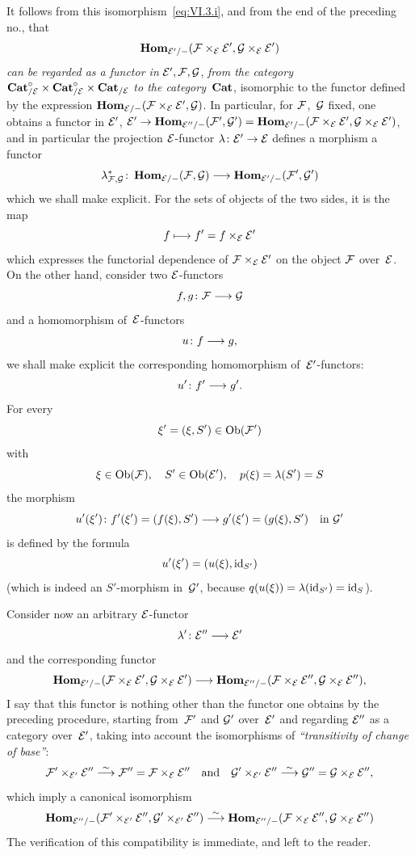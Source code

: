 It follows from this isomorphism~\eqref{eq:VI.3.i}, and from the end of
the preceding no., that
$$
\SheafHom_{\cal{E}'/-}(\cal{F}\times_{\cal{E}}\cal{E}',\cal{G}
\times_{\cal{E}}\cal{E}')
$$
\emph{can be regarded as a functor in}
$\cal{E}',\cal{F},\cal{G}$, \emph{from the category}
$\Cat_{/\cal{E}}^\circ\times\Cat_{/\cal{E}}^\circ\allowbreak\times\Cat_{/\cal{E}}$
\emph{to the category}~$\Cat$, isomorphic to the functor defined
by the expression
$\SheafHom_{\cal{E}/-}(\cal{F}\times_{\cal{E}}\cal{E}',\cal{G})$. In
particular, for $\cal{F}$,~$\cal{G}$ fixed, one obtains a
functor in $\cal{E}'$, $\cal{E}'\to
\SheafHom_{\cal{E}''/-}(\cal{F}',\cal{G}')=
\SheafHom_{\cal{E}'/-}(\cal{F}\times_{\cal{E}}
\cal{E}',\cal{G}\times_{\cal{E}}\cal{E}')$, and in particular the
projection $\cal{E}$-functor $\lambda\colon \cal{E}'\to\cal{E}$
defines a morphism \ie a functor
$$
\lambda^*_{\cal{F},\cal{G}}\colon
\SheafHom_{\cal{E}/-}(\cal{F},\cal{G})\to
\SheafHom_{\cal{E}'/-}(\cal{F}',\cal{G}')
$$
which we shall make explicit. For the sets of objects of the two
sides, it is the map
$$
f\mto f'=f\times_{\cal{E}}\cal{E}'
$$
which expresses the functorial dependence of
$\cal{F}\times_{\cal{E}}\cal{E}'$ on the object $\cal{F}$
over~$\cal{E}$. On the other hand, consider two $\cal{E}$-functors
$$
f,g\colon\cal{F}\to \cal{G}
$$
and a homomorphism of~$\cal{E}$-functors
$$
u\colon f\to g\quoi,
$$
we
shall make explicit the corresponding homomorphism of~$\cal{E}'$-functors:
$$
u'\colon f'\to g'\quoi.
$$
For every
$$
\xi'=(\xi,S')\in\Ob(\cal{F}')
$$
with
$$
\xi\in\Ob(\cal{F}),\quad S'\in\Ob(\cal{E}'),\quad p(\xi)=\lambda(S')=S
$$
the morphism
$$
u'(\xi')\colon f'(\xi')=(f(\xi),S')\to g'(\xi')=(g(\xi),S')\quad
\text{in } \cal{G}'
$$
is defined by the formula
$$
u'(\xi')=(u(\xi),\id_{S'})
$$
(which is indeed an $S'$-morphism in~$\cal{G}'$, because
$q(u(\xi))=\lambda(\id_{S'})=\id_S$).

Consider now an arbitrary $\cal{E}$-functor
$$
\lambda'\colon\cal{E}''\to\cal{E}'
$$
and the corresponding functor
$$
\SheafHom_{\cal{E}'/-}(\cal{F}\times_{\cal{E}}\cal{E}',
\cal{G}\times_{\cal{E}}\cal{E}')\to
\SheafHom_{\cal{E}''/-}(\cal{F}\times_{\cal{E}}\cal{E}'',
\cal{G}\times_{\cal{E}}\cal{E}'')\quoi,
$$
I say that this functor is nothing other than the functor one obtains by
the preceding procedure, starting from~$\cal{F}'$ and
$\cal{G}'$ over~$\cal{E}'$ and regarding $\cal{E}''$ as a
category over~$\cal{E}'$, taking into account the isomorphisms of
\emph{``transitivity of change of base''}:
$$
\cal{F}'\times_{\cal{E}'}\cal{E}''\isomto
\cal{F}''=\cal{F}\times_{\cal{E}}\cal{E}''\quad
\text{and}\quad\cal{G}'\times_{\cal{E}'}\cal{E}''\isomto\cal{G}''
=\cal G\times_{\cal E}\cal E''\quoi,
$$
which imply a canonical isomorphism
$$
\SheafHom_{\cal{E}''/-}(\cal{F}'\times_{\cal{E}'}\cal{E}'',
\cal{G}'\times_{\cal{E}'}\cal{E}'')\isomto
\SheafHom_{\cal{E}''/-}(\cal{F}\times_{\cal{E}}\cal{E}'',
\cal{G}\times_{\cal{E}}\cal{E}'')
$$
The
verification of this compatibility is immediate, and
left to the reader.

